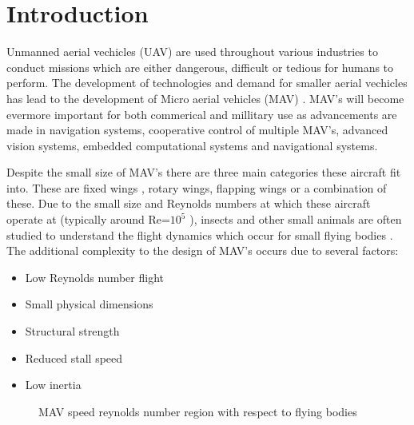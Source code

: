 \graphicspath{{./Figs/}}

\chapter{Introduction} 
\label{sec:Background}



Unmanned aerial vechicles (UAV) are used throughout various industries to conduct missions which are either dangerous, difficult or tedious for humans to perform. The development of technologies and demand for smaller aerial vechicles has lead to the development of Micro aerial vehicles (MAV) \cite{NONAMI2007}. MAV's will become evermore important for both commerical \cite{Liu2014} and millitary \cite{Chaturvedi2019} \cite{Fan2018} use as advancements are made in navigation systems, cooperative control of multiple MAV's, advanced vision systems, embedded computational systems and navigational systems.

Despite the small size of MAV's there are three main categories these aircraft fit into. These are fixed wings \cite{Stanford2008} \cite{Lasek2001}, rotary wings, flapping wings \cite{Platzer2012} or a combination of these. Due to the small size and Reynolds numbers at which these aircraft operate at (typically around Re=$10^5$ \cite{Huq2009}), insects and other small animals are often studied to understand the flight dynamics which occur for small flying bodies \cite{Liu2009}. The additional complexity to the design of MAV's occurs due to several factors:
\begin{itemize}
  \item Low Reynolds number flight
  \item Small physical dimensions
  \item Structural strength
  \item Reduced stall speed
  \item Low inertia
\end{itemize}

\begin{figure}[H]
  \centering
  \caption{MAV speed reynolds number region with respect to flying bodies}
  \label{fig:MAVsizes}
\end{figure}

